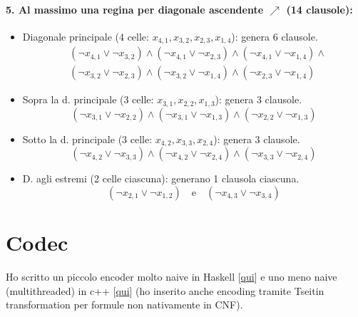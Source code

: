 \documentclass[10pt]{article}
\begin{document}
\paragraph{5. Al massimo una regina per diagonale ascendente $\nearrow$ (14 clausole):}
\begin{itemize}
    \item Diagonale principale (4 celle: $x_{4,1}, x_{3,2}, x_{2,3}, x_{1,4}$): genera 6 clausole.
    \[
    \begin{aligned}
        & (\neg x_{4,1} \lor \neg x_{3,2}) \land (\neg x_{4,1} \lor \neg x_{2,3}) \land (\neg x_{4,1} \lor \neg x_{1,4}) \land \\
        & (\neg x_{3,2} \lor \neg x_{2,3}) \land (\neg x_{3,2} \lor \neg x_{1,4}) \land (\neg x_{2,3} \lor \neg x_{1,4})
    \end{aligned}
    \]
    \item Sopra la d. principale (3 celle: $x_{3,1}, x_{2,2}, x_{1,3}$): genera 3 clausole.
    \[
        (\neg x_{3,1} \lor \neg x_{2,2}) \land (\neg x_{3,1} \lor \neg x_{1,3}) \land (\neg x_{2,2} \lor \neg x_{1,3})
    \]
    \item Sotto la d. principale (3 celle: $x_{4,2}, x_{3,3}, x_{2,4}$): genera 3 clausole.
    \[
        (\neg x_{4,2} \lor \neg x_{3,3}) \land (\neg x_{4,2} \lor \neg x_{2,4}) \land (\neg x_{3,3} \lor \neg x_{2,4})
    \]
    \item D. agli estremi (2 celle ciascuna): generano 1 clausola ciascuna.
    \[
        (\neg x_{2,1} \lor \neg x_{1,2}) \quad \text{e} \quad (\neg x_{4,3} \lor \neg x_{3,4})
    \]
\end{itemize}

\section{Codec}
Ho scritto un piccolo encoder molto naive in Haskell [\href{https://github.com/AglaiaNorza/ia/blob/main/SATencoder/naive-encoder.hs}{qui}] e uno meno naive (multithreaded) in c++ [\href{https://github.com/AglaiaNorza/ia/tree/main/SATencoder/multithreaded}{qui}] (ho inserito anche encoding tramite Tseitin transformation per formule non nativamente in CNF).
\end{document}
